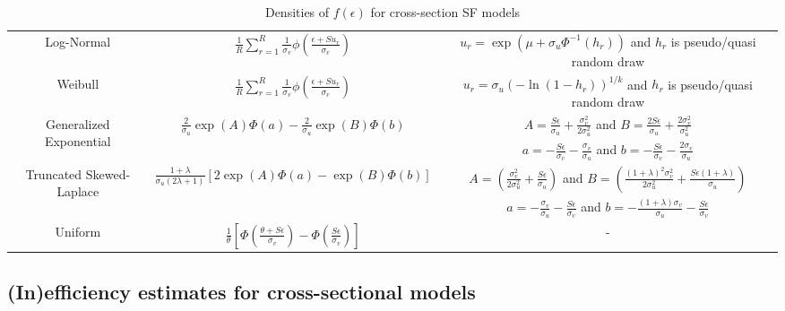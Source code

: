 \documentclass[nojss]{jss}
\begin{document}
\begin{appendix}
\begin{table}[h]
\begin{adjustbox}{max width=1\textwidth}
\begin{tabular}{@{}ccc@{}}
Log-Normal & $\frac{1}{R}\sum_{r = 1}^R\frac{1}{\sigma_v}\phi\left(
\frac{\epsilon+Su_r}{\sigma_v}\right)$ & 
$u_r=\exp{\left(\mu +\sigma_u\Phi^{-1}\left(h_r\right)\right)}$ and $h_r$ is pseudo/quasi random draw\\
Weibull & $\frac{1}{R}\sum_{r = 1}^R\frac{1}{\sigma_v}\phi\left(\frac{
\epsilon+Su_r}{\sigma_v}\right)$ & $u_r = \sigma_u\left(-\ln{\left(1-h_r\right)}\right)^{1/k}$ and $h_r$ is pseudo/quasi random draw\\
\multirow{2}{*}{Generalized Exponential} & \multirow{2}{*}{$\frac{2}{\sigma_u}\exp{\left(A\right)}\Phi 
\left(a\right)-\frac{2}{\sigma_u}\exp{\left(B\right)}\Phi\left(b\right)$} & $A=\frac{S\epsilon}{\sigma_u}+\frac{\sigma_v^2}{2\sigma_u^2}$ and 
$B = \frac{2S\epsilon}{\sigma_u}+\frac{2\sigma_v^2}{\sigma_u^2}$\\
& & $a = -\frac{S\epsilon}{\sigma_v}-\frac{\sigma_v}{\sigma_u}$ and $b = -\frac{S\epsilon}{\sigma_v}- \frac{2\sigma_v}{\sigma_u}$ \\
\multirow{2}{*}{Truncated Skewed-Laplace} & \multirow{2}{*}{$\frac{1+\lambda}{\sigma_u\left(2\lambda+1\right)}
\left[2\exp{\left(A\right)}\Phi\left(a\right)-\exp{\left(B\right)}\Phi\left(b\right)\right]$} & 
$A = \left(\frac{\sigma_v^2}{2\sigma_u^2}+\frac{S\epsilon}{\sigma_u}\right)$ and 
$B = \left(\frac{\left(1+\lambda\right)^2\sigma_v^2}{2\sigma_u^2}+\frac{S\epsilon\left(1+\lambda\right)}{\sigma_u}\right)$\\
& & $a = -\frac{\sigma_v}{\sigma_u}-\frac{S\epsilon}{\sigma_v}$ and $b = -\frac{\left(1+\lambda\right)\sigma_v}{\sigma_u}-\frac{S\epsilon}{\sigma_v}$ \\
Uniform &  $\frac{1}{\theta}\left[\Phi\left(\frac{\theta + S\epsilon}{\sigma_v}
\right)-\Phi\left(\frac{S\epsilon}{\sigma_v}\right)\right]$ & -\\
\bottomrule
\end{tabular}
\end{adjustbox}
\caption{Densities of $f(\epsilon)$ for cross-section SF models}
\label{table:mlsfcross}
\end{table}


\newpage

\subsection{(In)efficiency estimates for cross-sectional models}


\end{appendix}
\end{document}
